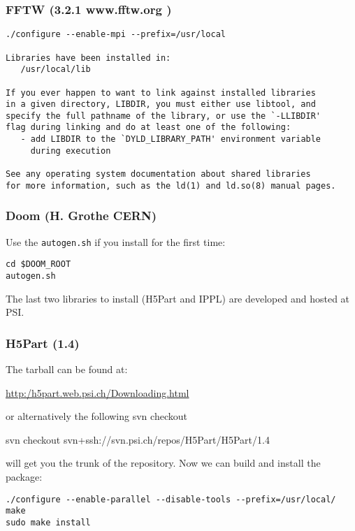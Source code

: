 \subsubsection{FFTW (3.2.1 www.fftw.org ) }
\begin{footnotesize}
\begin{verbatim}
./configure --enable-mpi --prefix=/usr/local

Libraries have been installed in:
   /usr/local/lib

If you ever happen to want to link against installed libraries
in a given directory, LIBDIR, you must either use libtool, and
specify the full pathname of the library, or use the `-LLIBDIR'
flag during linking and do at least one of the following:
   - add LIBDIR to the `DYLD_LIBRARY_PATH' environment variable
     during execution

See any operating system documentation about shared libraries 
for more information, such as the ld(1) and ld.so(8) manual pages.
\end{verbatim}
\end{footnotesize}

\subsubsection{Doom (H. Grothe CERN) }
Use the {\tt autogen.sh} if you install for the first time:
\begin{verbatim}
cd $DOOM_ROOT
autogen.sh
\end{verbatim}
The last two libraries to install (H5Part  and IPPL) are developed and hosted at PSI.
\subsubsection{H5Part (1.4)}
The tarball can be found at:
\begin{center}
\url{http:/h5part.web.psi.ch/Downloading.html} 
\end{center}
or alternatively the following svn checkout
\begin{center}
svn checkout svn+ssh://svn.psi.ch/repos/H5Part/H5Part/1.4
\end{center}
will get you the trunk of the repository. 
Now we can build and install the package:
\begin{footnotesize}
\begin{verbatim}
./configure --enable-parallel --disable-tools --prefix=/usr/local/
make 
sudo make install
\end{verbatim}
\end{footnotesize}

